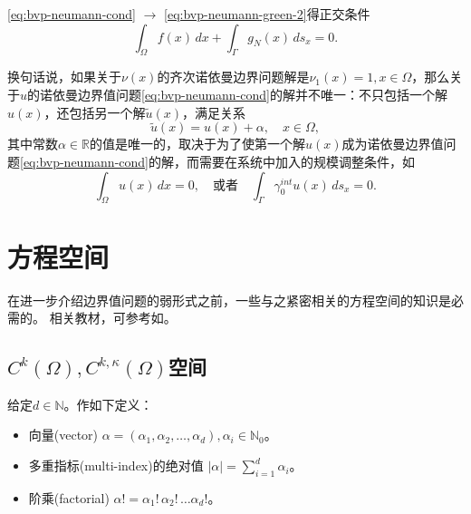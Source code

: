 \eqref{eq:bvp-neumann-cond} $\rightarrow$ \eqref{eq:bvp-neumann-green-2}得正交条件
\begin{equation}
  \label{eq:bvp-neumann-green-2-new}
  \int_{\Omega} f(x) \, dx + \int_{\Gamma} g_N(x) \, d s_x = 0.
\end{equation}

换句话说，如果关于$\nu(x)$的齐次诺依曼边界问题解是$\nu_1(x)=1, x \in \Omega$，那么关于$u$的诺依曼边界值问题\eqref{eq:bvp-neumann-cond}的解并不唯一：不只包括一个解$u(x)$，还包括另一个解$\tilde{u}(x)$，满足关系
\begin{equation*}
  \tilde{u}(x) = u(x) + \alpha, \quad x \in \Omega,
\end{equation*}
其中常数$\alpha \in \mathbb{R}$的值是唯一的，取决于为了使第一个解$u(x)$成为诺依曼边界值问题\eqref{eq:bvp-neumann-cond}的解，而需要在系统中加入的规模调整条件，如
\begin{equation*}
  \int_{\Omega} u(x) \, dx = 0, \quad \text{或者} \quad \int_{\Gamma} \gamma_0^{int}u(x) \, ds_x =0.
\end{equation*}

\section{方程空间}
在进一步介绍边界值问题的弱形式之前，一些与之紧密相关的方程空间的知识是必需的。
相关教材，可参考如\cite{McLean:2000ta, Adams:2003wi, Tartar:2007vm, Mazya:2009vz, Mazya:2009wu}。

\subsection{\texorpdfstring{$C^{k}(\Omega),C^{k,\kappa}(\Omega)$}{CK}空间}

给定$d \in \mathbb{N}$。作如下定义：
\begin{itemize}
  \item 向量(vector) $\alpha = \left( \alpha_1, \alpha_2, \ldots, \alpha_d \right), \alpha_i \in \mathbb{N}_0$。
  \item 多重指标(multi-index)的绝对值 $\left| \alpha \right|=\sum_{i=1}^{d} \alpha_i$。
  \item 阶乘(factorial) $\alpha ! = \alpha_1! \, \alpha_2 ! \,  \ldots \alpha_d !$。
\end{itemize}

